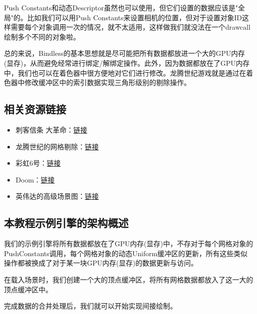 \documentclass{ctexart}
\begin{document}
Push Constants和动态Descriptor虽然也可以使用，但它们设置的数据应该是"全局"的。比如我们可以用Push Constants来设置相机的位置，但对于设置对象ID这样需要每个对象调用一次的情况，就不太适用，这样做我们就没法在一个drawcall绘制多个不同的对象啦。

总的来说，Bindless的基本思想就是尽可能把所有数据都放进一个大的GPU内存(显存)，从而避免经常进行绑定/解绑定操作。此外，因为数据都放在了GPU内存中，我们也可以在着色器中很方便地对它们进行修改。龙腾世纪游戏就是通过在着色器中修改缓冲区中的索引数据实现三角形级别的剔除操作。

\subsection{相关资源链接}

\begin{itemize}
	\item 刺客信条 大革命：\href{https://www.advances.realtimerendering.com/s2015/aaltonenhaar_siggraph2015_combined_final_footer_220dpi.pdf}{链接}
	\item 龙腾世纪的网格剔除：\href{https://www.gdcvault.com/play/1023109/Optimizing-the-Graphics-Pipeline-With}{链接}
	\item 彩虹6号：\href{https://www.gdcvault.com/play/1022990/Rendering-Rainbow-Six-Siege}{链接}
	\item Doom：\href{https://advances.realtimerendering.com/s2020/RenderingDoomEternal.pdf}{链接}
	\item 英伟达的高级场景图：\href{https://on-demand.gputechconf.com/gtc/2013/presentations/S3032-Advanced-Scenegraph-Rendering-Pipeline.pdf}{链接}
\end{itemize}

\subsection{本教程示例引擎的架构概述}

我们的示例引擎将所有数据都放在了GPU内存(显存)中，不存对于每个网格对象的PushConstants调用，每个网格对象的动态Uniform缓冲区的更新，所有这些类似操作都被换成了对于某一块GPU内存(显存)的数据更新与访问。

在载入场景时，我们创建一个大的顶点缓冲区，将所有网格数据都放入了这一大的顶点缓冲区中。

完成数据的合并处理后，我们就可以开始实现间接绘制。
\end{document}
